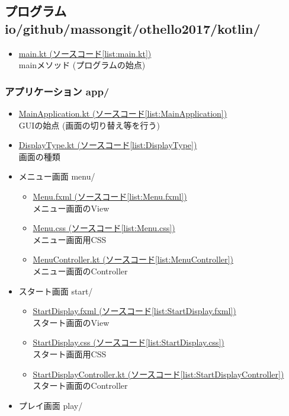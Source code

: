 \documentclass[uplatex,titlepage]{jsarticle}
\begin{document}
\clearpage
\subsection{プログラム io/github/massongit/othello2017/kotlin/}
\begin{itemize}
\item \underline{main.kt (ソースコード\ref{list:main.kt})}\\
mainメソッド (プログラムの始点)
\end{itemize}

\subsubsection{アプリケーション app/}
\begin{itemize}
\item \underline{MainApplication.kt (ソースコード\ref{list:MainApplication})}\\
GUIの始点 (画面の切り替え等を行う)
\item \underline{DisplayType.kt (ソースコード\ref{list:DisplayType})}\\
画面の種類
\item メニュー画面 menu/
\begin{itemize}
\item \underline{Menu.fxml (ソースコード\ref{list:Menu.fxml})}\\
メニュー画面のView
\item \underline{Menu.css (ソースコード\ref{list:Menu.css})}\\
メニュー画面用CSS
\item \underline{MenuController.kt (ソースコード\ref{list:MenuController})}\\
メニュー画面のController
\end{itemize}
\item スタート画面 start/
\begin{itemize}
\item \underline{StartDisplay.fxml (ソースコード\ref{list:StartDisplay.fxml})}\\
スタート画面のView
\item \underline{StartDisplay.css (ソースコード\ref{list:StartDisplay.css})}\\
スタート画面用CSS
\item \underline{StartDisplayController.kt (ソースコード\ref{list:StartDisplayController})}\\
スタート画面のController
\end{itemize}
\item プレイ画面 play/

\end{itemize}
\end{document}
